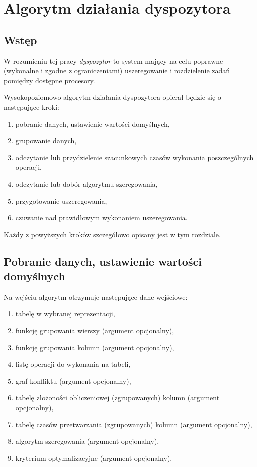 \documentclass[brudnopis]{xmgr}
\begin{document}
\chapter{Algorytm działania dyspozytora}


\section{Wstęp}

W rozumieniu tej pracy \emph{dyspozytor} to system mający na celu poprawne (wykonalne i zgodne z ograniczeniami) uszeregowanie i rozdzielenie zadań pomiędzy dostępne procesory.
\medskip

Wysokopoziomowo algorytm działania dyspozytora opierał będzie się o następujące kroki:

\begin{enumerate}
    \item pobranie danych, ustawienie wartości domyślnych,
    \item grupowanie danych,
    \item odczytanie lub przydzielenie szacunkowych czasów wykonania poszczególnych operacji,
    \item odczytanie lub dobór algorytmu szeregowania,
    \item przygotowanie uszeregowania,
    \item czuwanie nad prawidłowym wykonaniem uszeregowania.
\end{enumerate}

Każdy z powyższych kroków szczegółowo opisany jest w tym rozdziale.
\newpage


\section{Pobranie danych, ustawienie wartości domyślnych}

Na wejściu algorytm otrzymuje następujące dane wejściowe:

\begin{enumerate}
    \item tabelę w wybranej reprezentacji,
    \item funkcję grupowania wierszy (argument opcjonalny),
    \item funkcję grupowania kolumn (argument opcjonalny),
    \item listę operacji do wykonania na tabeli,
    \item graf konfliktu (argument opcjonalny),
    \item tabelę złożoności obliczeniowej (zgrupowanych) kolumn (argument opcjonalny),
    \item tabelę czasów przetwarzania (zgrupowanych) kolumn (argument opcjonalny),
    \item algorytm szeregowania (argument opcjonalny),
    \item kryterium optymalizacyjne (argument opcjonalny).
\end{enumerate}
\end{document}
